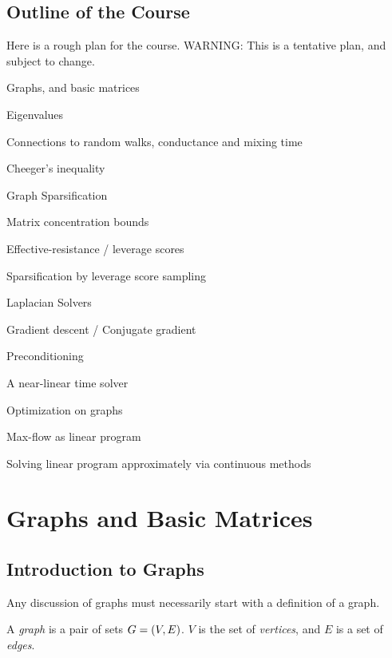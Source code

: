 \documentclass[11pt]{article}
\newenvironment{tight_enumerate}{
\begin{enumerate}
 \setlength{\itemsep}{2pt}
 \setlength{\parskip}{1pt}
}{\end{enumerate}}
\newenvironment{tight_itemize}{
\begin{itemize}
 \setlength{\itemsep}{2pt}
 \setlength{\parskip}{1pt}
}{\end{itemize}}
\begin{document}
\subsection{Outline of the Course}
Here is a rough plan for the course. WARNING: This is a tentative
plan, and subject to change.
\begin{tight_enumerate}
\item Graphs, and basic matrices
  \begin{tight_itemize}
  \item Eigenvalues
  \item Connections to random walks, conductance and mixing time
  \item Cheeger's inequality
  \end{tight_itemize}
\item Graph Sparsification
  \begin{tight_itemize}
  \item Matrix concentration bounds
  \item Effective-resistance / leverage scores
  \item Sparsification by leverage score sampling
  \end{tight_itemize}
\item Laplacian Solvers
  \begin{tight_itemize}
  \item Gradient descent / Conjugate gradient
  \item Preconditioning
  \item A near-linear time solver
  \end{tight_itemize}
\item Optimization on graphs
  \begin{tight_itemize}
  \item Max-flow as linear program
  \item Solving linear program approximately via continuous methods
  \end{tight_itemize}
\end{tight_enumerate}

\section{Graphs and Basic Matrices}
\subsection{Introduction to Graphs}
Any discussion of graphs must necessarily start with a definition of a graph.
\begin{definition}
A \emph{graph} is a pair of sets $G=\paren{V,E}$.
$V$ is the set of \emph{vertices}, and $E$ is a set of \emph{edges}.
\end{definition}
\end{document}
